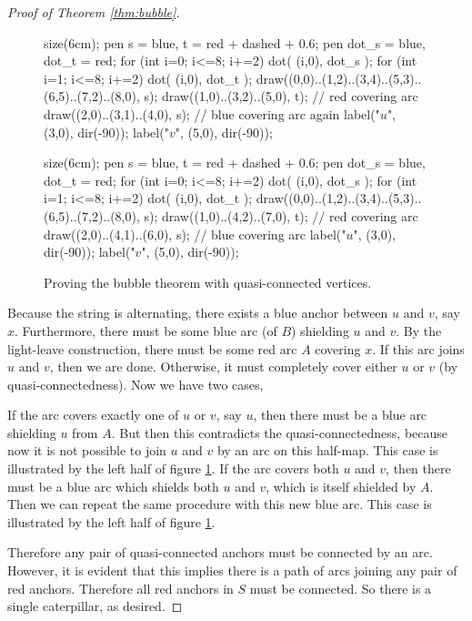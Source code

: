 \begin{proof}[Proof of Theorem \ref{thm:bubble}]
	\begin{figure}[ht]
		\centering
		\begin{asy}
			size(6cm);
			pen s = blue, t = red + dashed + 0.6;
			pen dot_s = blue, dot_t = red;
			for (int i=0; i<=8; i+=2) { dot( (i,0), dot_s ); }
			for (int i=1; i<=8; i+=2) { dot( (i,0), dot_t ); }
			draw((0,0)..(1,2)..(3,4)..(5,3)..(6,5)..(7,2)..(8,0), s);
			draw((1,0)..(3,2)..(5,0), t); // red covering arc
			draw((2,0)..(3,1)..(4,0), s); // blue covering arc again
			label("$u$", (3,0), dir(-90));
			label("$v$", (5,0), dir(-90));
		\end{asy}
		\hspace{2em}
		\begin{asy}
			size(6cm);
			pen s = blue, t = red + dashed + 0.6;
			pen dot_s = blue, dot_t = red;
			for (int i=0; i<=8; i+=2) { dot( (i,0), dot_s ); }
			for (int i=1; i<=8; i+=2) { dot( (i,0), dot_t ); }
			draw((0,0)..(1,2)..(3,4)..(5,3)..(6,5)..(7,2)..(8,0), s);
			draw((1,0)..(4,2)..(7,0), t); // red covering arc
			draw((2,0)..(4,1)..(6,0), s); // blue covering arc
			label("$u$", (3,0), dir(-90));
			label("$v$", (5,0), dir(-90));
		\end{asy}
		\caption{Proving the bubble theorem with quasi-connected vertices.}
		\label{fig:pf_bubble}
	\end{figure}
	Because the string is alternating, there exists a blue anchor between $u$ and $v$, say $x$.  Furthermore, there must be some blue arc (of $B$) shielding $u$ and $v$.  By the light-leave construction, there must be some red arc $A$ covering $x$.  If this arc joins $u$ and $v$, then we are done.  Otherwise, it must completely cover either $u$ or $v$ (by quasi-connectedness).  Now we have two cases,
	\begin{itemize}
		\ii If the arc covers exactly one of $u$ or $v$, say $u$, then there must be a blue arc shielding $u$ from $A$.  But then this contradicts the quasi-connectedness, because now it is not possible to join $u$ and $v$ by an arc on this half-map.  This case is illustrated by the left half of figure \ref{fig:pf_bubble}.
		\ii If the arc covers both $u$ and $v$, then there must be a blue arc which shields both $u$ and $v$, which is itself shielded by $A$.  Then we can repeat the same procedure with this new blue arc.  This case is illustrated by the left half of figure \ref{fig:pf_bubble}.
	\end{itemize}
	Therefore any pair of quasi-connected anchors must be connected by an arc.  However, it is evident that this implies there is a path of arcs joining any pair of red anchors.  Therefore all red anchors in $S$ must be connected.  So there is a single caterpillar, as desired.
\end{proof}

